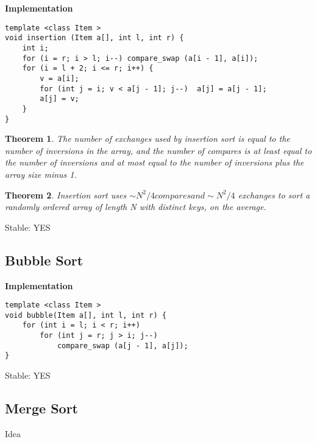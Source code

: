 \documentclass{article}
\newtheorem*{theorem}{Theorem}
\begin{document}
\textbf{Implementation}
\begin{verbatim}
template <class Item >
void insertion (Item a[], int l, int r) {
    int i;
    for (i = r; i > l; i--) compare_swap (a[i - 1], a[i]);
    for (i = l + 2; i <= r; i++) {
        v = a[i];
        for (int j = i; v < a[j - 1]; j--)  a[j] = a[j - 1];
        a[j] = v;
    }
}
\end{verbatim}

\begin{theorem}
 The number of exchanges used by insertion sort is equal to the number of
inversions in the array, and the number of compares is at least equal to the
number of inversions and at most equal to the number of inversions plus the array size minus 1.
\end{theorem}

\begin{theorem}
 Insertion sort uses $\sim N^2/4 compares and \sim N^2/4$ exchanges to sort a randomly ordered array of length N with distinct keys, on the average.
\end{theorem}
Stable: YES
\subsection{Bubble Sort}

\textbf{Implementation}
\begin{verbatim}
template <class Item >
void bubble(Item a[], int l, int r) {
    for (int i = l; i < r; i++)
        for (int j = r; j > i; j--)
            compare_swap (a[j - 1], a[j]);
}
\end{verbatim}
Stable: YES

\subsection{Merge Sort}
Idea
\end{document}
